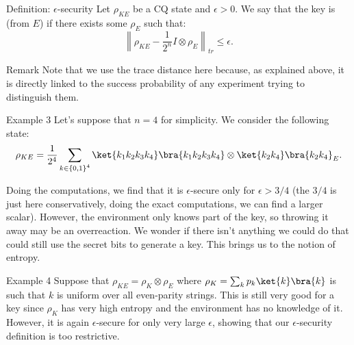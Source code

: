 \documentclass[a4paper]{article}
\begin{document}
\begin{parag}{Definition: $\epsilon$-security}
    Let $\rho_{KE}$ be a CQ state and $\epsilon > 0$. We say that the key is  (from $E$) if there exists some $\rho_E$ such that: 
    \[\left\|\rho_{KE} - \frac{1}{2^n} I \otimes \rho_E\right\|_{tr} \leq \epsilon.\]


    \begin{subparag}{Remark}
        Note that we use the trace distance here because, as explained above, it is directly linked to the success probability of any experiment trying to distinguish them.
    \end{subparag}
\end{parag}


\begin{parag}{Example 3}
    Let's suppose that $n = 4$ for simplicity. We consider the following state: 
    \[\rho_{KE} = \frac{1}{2^4} \sum_{k \in \left\{0, 1\right\}^4} \ket{k_1 k_2 k_3 k_4}\bra{k_1 k_2 k_3 k_4} \otimes \ket{k_2 k_4}\bra{k_2 k_4}_E.\]

    Doing the computations, we find that it is $\epsilon$-secure only for $\epsilon > 3/4$ (the $3/4$ is just here conservatively, doing the exact computations, we can find a larger scalar). However, the environment only knows part of the key, so throwing it away may be an overreaction. We wonder if there isn't anything we could do that could still use the secret bits to generate a key. This brings us to the notion of entropy.
\end{parag}

\begin{parag}{Example 4}
    Suppose that $\rho_{KE} = \rho_K \otimes \rho_E$ where $\rho_K = \sum_{k} p_k \ket{k}\bra{k}$ is such that $k$ is uniform over all even-parity strings. This is still very good for a key since $\rho_K$ has very high entropy and the environment has no knowledge of it. However, it is again $\epsilon$-secure for only very large $\epsilon$, showing that our $\epsilon$-security definition is too restrictive.
\end{parag}
\end{document}

